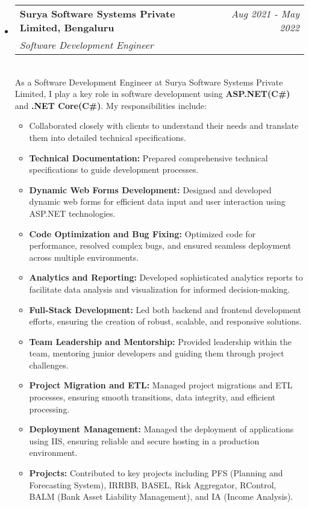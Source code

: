 \documentclass[a4paper,12pt]{article}
\makeatletter
\newcommand{\resumeSubHeadingListStart}{\begin{itemize}[leftmargin=*,labelsep=1mm,noitemsep]}
\newcommand{\resumeSubHeadingListEnd}{\end{itemize}\vspace{2mm}}
\newcommand{\resumeItemListStart}{\begin{itemize}[leftmargin=3ex, rightmargin=2ex, noitemsep,labelsep=1.2mm,itemsep=0mm]\small}
\newcommand{\resumeItemListEnd}{\end{itemize}\vspace{-2mm}}
\newcommand{\resumeExperience}[4]{
\vspace{0.5mm}\item
    \begin{tabular*}{0.98\textwidth}[t]{l@{\extracolsep{\fill}}r}
        \textbf{#1} & \textit{\footnotesize{#3}}\\
        \textit{\footnotesize{#2}} & {}
    \end{tabular*}\\ [1mm]
    \footnotesize{#4}
}
\newcommand{\emptyLine}{\\[-3mm]}
\makeatother
\begin{document}
\resumeSubHeadingListStart
\resumeExperience {Surya Software Systems Private Limited, Bengaluru}
 {Software Development Engineer} {Aug 2021 - May 2022}
{
As a Software Development Engineer at Surya Software Systems Private Limited, I play a key role in software development using \textbf{ASP.NET(C\#)} and \textbf{.NET Core(C\#)}. My responsibilities include:
}\emptyLine
\resumeItemListStart
    \item  Collaborated closely with clients to understand their needs and translate them into detailed technical specifications.
    \item \textbf{Technical Documentation:} Prepared comprehensive technical specifications to guide development processes.
    \item \textbf{Dynamic Web Forms Development:} Designed and developed dynamic web forms for efficient data input and user interaction using ASP.NET technologies.
    \item \textbf{Code Optimization and Bug Fixing:} Optimized code for performance, resolved complex bugs, and ensured seamless deployment across multiple environments.
    \item \textbf{Analytics and Reporting:} Developed sophisticated analytics reports to facilitate data analysis and visualization for informed decision-making.
    \item \textbf{Full-Stack Development:} Led both backend and frontend development efforts, ensuring the creation of robust, scalable, and responsive solutions.
    \item \textbf{Team Leadership and Mentorship:} Provided leadership within the team, mentoring junior developers and guiding them through project challenges.
    \item \textbf{Project Migration and ETL:} Managed project migrations and ETL processes, ensuring smooth transitions, data integrity, and efficient processing.
    \item \textbf{Deployment Management:} Managed the deployment of applications using IIS, ensuring reliable and secure hosting in a production environment.
    \item \textbf{Projects:} Contributed to key projects including PFS (Planning and Forecasting System), IRRBB, BASEL, Risk Aggregator, RControl, BALM (Bank Asset Liability Management), and IA (Income Analysis).
    \resumeItemListEnd
\resumeSubHeadingListEnd


\vfill
\end{document}

